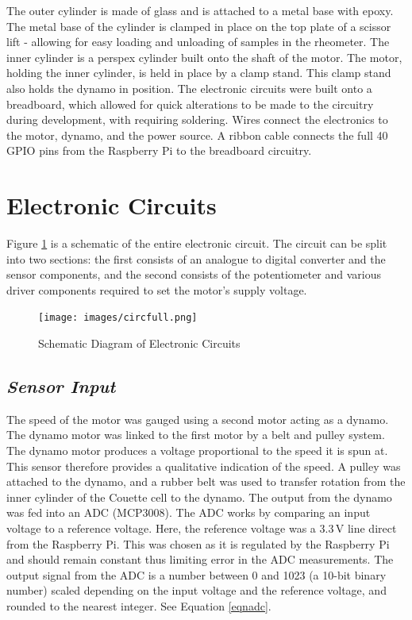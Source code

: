 \documentclass[twoside,a4]{report}
\def\br{\newline \newline \noindent}
\begin{document}
	\br
	The outer cylinder is made of glass and is attached to a metal base with epoxy. The metal base of the cylinder is clamped in place on the top plate of a scissor lift - allowing for easy loading and unloading of samples in the rheometer. The inner cylinder is a perspex cylinder built onto the shaft of the motor. The motor, holding the inner cylinder, is held in place by a clamp stand. This clamp stand also holds the dynamo in position.
	\br
	The electronic circuits were built onto a breadboard, which allowed for quick alterations to be made to the circuitry during development, with requiring soldering. Wires connect the electronics to the motor, dynamo, and the power source. A ribbon cable connects the full 40 GPIO pins from the Raspberry Pi to the breadboard circuitry.
	
	\section{Electronic Circuits} %
	Figure \ref{circfull} is a schematic of the entire electronic circuit. The circuit can be split into two sections: the first consists of an analogue to digital converter and the sensor components, and the second consists of the potentiometer and various driver components required to set the motor's supply voltage.
	\begin{figure}[!htb]
		\centering
		\texttt{[image: images/circfull.png]}
		\caption{Schematic Diagram of Electronic Circuits}
		\label{circfull}
	\end{figure}
	
	\subsection*{\textit{Sensor Input}} %
	The speed of the motor was gauged using a second motor acting as a dynamo. The dynamo motor was linked to the first motor by a belt and pulley system. The dynamo motor produces a voltage proportional to the speed it is spun at. This sensor therefore provides a qualitative indication of the speed. A pulley was attached to the dynamo, and a rubber belt was used to transfer rotation from the inner cylinder of the Couette cell to the dynamo. The output from the dynamo was fed into an ADC (MCP3008). The ADC works by comparing an input voltage to a reference voltage. Here, the reference voltage was a 3.3\,V line direct from the Raspberry Pi. This was chosen as it is regulated by the Raspberry Pi and should remain constant thus limiting error in the ADC measurements. The output signal from the ADC is a number between 0 and 1023 (a 10-bit binary number) scaled depending on the input voltage and the reference voltage, and rounded to the nearest integer. See Equation \ref{eqnadc}.
	
\end{document}
